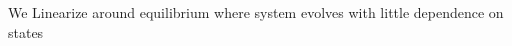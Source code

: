 \documentclass[preview]{standalone}
\begin{document}
\begin{center}
We Linearize around equilibrium where system evolves with little dependence on states
\end{center}
\end{document}

